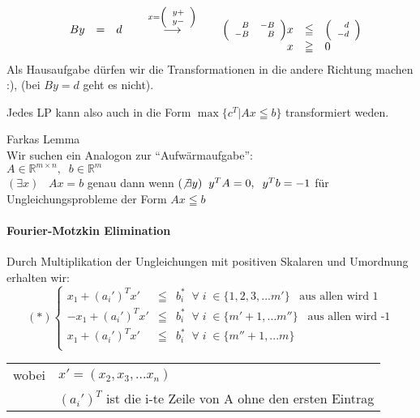 \documentclass[12pt,titlepage,a4paper] {report}
\newcommand{\RR}{\mathbb{R}}
\begin{document}
\[\begin{array}{l@{\hspace{3mm}}rcl@{\hspace{8mm}}c@{\hspace{8mm}}rcl}
&By&=&d&\stackrel{x={\scriptsize\left(\begin{array}{r}y+\\y-\end{array}
\right)}}{\longrightarrow}&   
{\scriptsize\left(\begin{array}{rr}B&-B\\-B&B\end{array}\right)}
x&\leqq& {\scriptsize\left(\begin{array}{r}d\\-d\end{array}
\right)}\\
&&&&&x&\geqq& 0
\end{array}\]
Als Hausaufgabe dürfen wir die Transformationen in die andere Richtung
machen :), (bei $By=d$ geht es nicht).

Jedes LP kann also auch in die Form $\max \{c^{T}| Ax \leqq b\}$ transformiert
weden.

\begin{satz} Farkas Lemma\\
Wir suchen ein Analogon zur "`Aufwärmaufgabe"':\\
$A \in \RR^{m\times n}, \; \; b \in \RR^{m}$\\
$(\exists x) \; \;\; Ax = b$ genau dann wenn $(\not\exists y) \; \; y^{T}A
= 0, \; \; y^{T}b=-1$ für Ungleichungsprobleme der Form $Ax\leqq b$

\end{satz}

\paragraph{Fourier-Motzkin Elimination}

Durch Multiplikation der Ungleichungen mit positiven Skalaren und Umordnung
erhalten wir:
\[
(*)\left\{\begin{array}{rcl}
x_{1} + (a_{i}')^{T}  x'&\leqq& b^{*}_{i} \;\; \forall \; i\; \in \{1,2,3,...m'\}\;\;\; \mbox{aus allen wird 1}\\
-x_{1} + (a_{i}')^{T}  x'&\leqq& b^{*}_{i} \;\; \forall \; i\; \in
\{m'+1,...m''\}\;\;\; \mbox{aus allen wird -1}\\
x_{1} + (a_{i}')^{T}  x'&\leqq& b^{*}_{i} \;\; \forall \; i\; \in
\{m''+1,...m\}\\
\end{array}\right.
\]
\begin{tabular}{ll}
wobei&$x'=(x_{2}, x_{3},...x_{n})$\\
&$(a_{i}')^{T}$ ist die i-te Zeile von A ohne den ersten Eintrag
\end{tabular}
\end{document}
